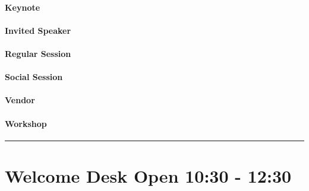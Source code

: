 \documentclass[
]{book}
\begin{document}
\begin{keynote}
\hypertarget{keynote}{%
\paragraph{Keynote}\label{keynote}}
\end{keynote}

\begin{speaker}
\hypertarget{invited-speaker}{%
\paragraph{Invited Speaker}\label{invited-speaker}}
\end{speaker}

\begin{session}
\hypertarget{regular-session}{%
\paragraph{Regular Session}\label{regular-session}}
\end{session}

\begin{social}
\hypertarget{social-session}{%
\paragraph{Social Session}\label{social-session}}
\end{social}

\begin{vendor}
\hypertarget{vendor}{%
\paragraph{Vendor}\label{vendor}}
\end{vendor}

\begin{workshop}
\hypertarget{workshop}{%
\paragraph{Workshop}\label{workshop}}
\end{workshop}

\begin{center}\rule{0.5\linewidth}{0.5pt}\end{center}

\hypertarget{welcome-desk-open-1030---1230}{%
\section*{Welcome Desk Open \textbar{} 10:30 - 12:30}\label{welcome-desk-open-1030---1230}}
\end{document}

